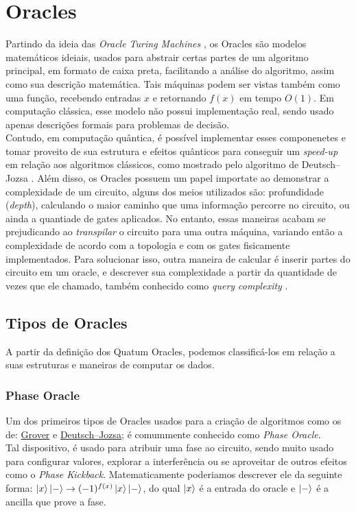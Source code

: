 \documentclass{article}
\begin{document}
\section{Oracles}
Partindo da ideia das \emph{Oracle Turing Machines} \cite{SOARE2009368}\cite{amreen_oracle}\cite{kalyanasyndaram_2021_mod04lec23}\cite{e21080800}, os Oracles são modelos matemáticos ideiais, usados para abstrair certas partes de um algoritmo principal, em formato de caixa preta, facilitando a análise do algoritmo, assim como sua descrição matemática. Tais máquinas podem ser vistas também como uma função, recebendo entradas $x$ e retornando $f(x)$ em tempo $O(1)$. Em computação clássica, esse modelo não possui implementação real, sendo usado apenas descrições formais para problemas de decisão.\\
Contudo, em computação quântica, é possível implementar esses componenetes e tomar proveito de sua estrutura e efeitos quânticos para conseguir um \emph{speed-up} em relação aos algoritmos clássicos, como mostrado pelo algoritmo de Deutsch–Jozsa \cite{Fan_2007}. Além disso, os Oracles possuem um papel importate ao demonstrar a complexidade de um circuito, alguns dos meios utilizados são: profundidade (\emph{depth}), calculando o maior caminho que uma informação percorre no circuito, ou ainda a quantiade de gates aplicados. No entanto, essas maneiras acabam se prejudicando ao \emph{transpilar} o circuito para uma outra máquina, variando então a complexidade de acordo com a topologia e com os gates fisicamente implementados. Para solucionar isso, outra maneira de calcular é inserir partes do circuito em um oracle, e descrever sua complexidade a partir da quantidade de vezes que ele chamado, também conhecido como \emph{query complexity} \cite{odonnell_2015_lecture} \cite{e21080800}.

\subsection{Tipos de Oracles}

A partir da definição dos Quatum Oracles, podemos classificá-los em relação a suas estruturas e maneiras de computar os dados.

\subsubsection{Phase Oracle}
Um dos primeiros tipos de Oracles usados para a criação de algoritmos como os de: \href{https://en.wikipedia.org/wiki/Grover%27s_algorithm}{Grover} e \href{https://en.wikipedia.org/wiki/Deutsch%E2%80%93Jozsa_algorithm}{Deutsch–Jozsa}; é comummente conhecido como \emph{Phase Oracle}.\\
Tal dispositivo, é usado para atribuir uma fase ao circuito, sendo muito usado para configurar valores, explorar a interferência ou se aproveitar de outros efeitos como o \textit{Phase Kickback}. Matematicamente poderiamos descrever ele da seguinte forma: $\mathinner{|{x}\rangle}\mathinner{|{-}\rangle} \to (-1)^{f(x)}\mathinner{|{x}\rangle}\mathinner{|{-}\rangle}$, do qual $\mathinner{|{x}\rangle}$ é a entrada do oracle e $\mathinner{|{-}\rangle}$ é a ancilla que prove a fase.
\end{document}
